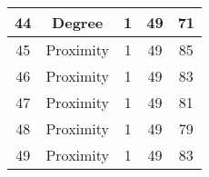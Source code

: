 \documentclass[results.tex]{subfiles}
\begin{document}
\begin{center}
\begin{tabular}{| c || c | c | c | c |}
            \hline
            44                      & Degree                       & 1                      & 49                      & 71                   \\
            \hline
            45                      & Proximity                    & 1                      & 49                      & 85                   \\
            \hline
            46                      & Proximity                    & 1                      & 49                      & 83                   \\
            \hline
            47                      & Proximity                    & 1                      & 49                      & 81                   \\
            \hline
            48                      & Proximity                    & 1                      & 49                      & 79                   \\
            \hline
            49                      & Proximity                    & 1                      & 49                      & 83                   \\
            \hline
        \end{tabular}
    \end{center}
\end{document}

